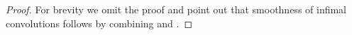 \documentclass[11pt,onecolumn]{article}
\DeclareMathOperator*{\argmin}{arg\,min}
\DeclareMathOperator*{\argminimax}{arg\,minimax}
\DeclareMathOperator*{\argmax}{arg\,max}
\DeclareMathOperator{\infconv}{\mathbin{\square}}
\newcommand{\bR}{\mathbb{R}}
\theoremstyle{remark}
\begin{document}
\begin{proof}
For brevity we omit the proof and point out that smoothness of infimal convolutions follows by combining \cite[Proposition 15.7]{BaCo110} and \cite[Proposition 18.8]{BaCo110}.

\end{proof}
\end{document}
